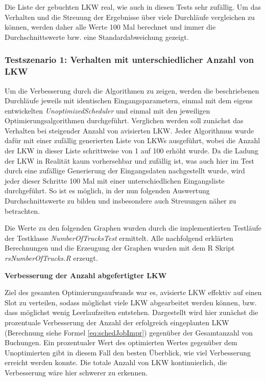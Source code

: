 Die Liste der gebuchten LKW real, wie auch in diesen Tests sehr zufällig. Um das Verhalten und die Streuung der Ergebnisse über viele Durchläufe vergleichen zu können, werden daher alle Werte 100 Mal berechnet und immer die Durchschnittswerte bzw. eine Standardabweichung gezeigt. 

\subsubsection{Testszenario 1: Verhalten mit unterschiedlicher Anzahl von LKW}

Um die Verbesserung durch die Algorithmen zu zeigen, werden die beschriebenen Durchläufe jeweils mit identischen Eingangsparametern, einmal mit dem eigens entwickelten \textit{UnoptimizedScheduler} und einmal mit den jeweiligen Optimierungsalgorithmen durchgeführt. Verglichen werden soll zunächst das Verhalten bei steigender Anzahl von avisierten LKW. Jeder Algorithmus wurde dafür mit einer zufällig generierten Liste von LKWs ausgeführt, wobei die Anzahl der LKW in dieser Liste schrittweise von 1 auf 100  erhöht wurde. Da die Ladung der LKW in Realität kaum vorhersehbar und zufällig ist, was auch hier im Test durch eine zufällige Generierung der Eingangsdaten nachgestellt wurde, wird jeder dieser Schritte 100 Mal mit einer unterschiedlichen Eingangsliste durchgeführt. So ist es möglich, in der nun folgenden Auswertung Durchschnittswerte zu bilden und insbesondere auch Streuungen näher zu betrachten.

Die Werte zu den folgenden Graphen wurden durch die implementierten Testläufe der Testklasse \textit{NumberOfTrucksTest} ermittelt. Alle nachfolgend erklärten Berechnungen und die Erzeugung der Graphen wurden mit dem R Skript \textit{rsNumberOfTrucks.R} erzeugt.


\textbf{Verbesserung der Anzahl abgefertigter LKW}

Ziel des gesamten Optimierungsaufwands war es, avisierte LKW effektiv auf einen Slot zu verteilen, sodass möglichst viele LKW abgearbeitet werden können, bzw. dass möglichst wenig Leerlaufzeiten entstehen. Dargestellt wird hier zunächst die prozentuale Verbesserung der Anzahl der erfolgreich eingeplanten LKW (Berechnung siehe Formel \ref{eq:schedJobImpr}) gegenüber der Gesamtanzahl von Buchungen. Ein prozentualer Wert des optimierten Wertes gegenüber dem Unoptimierten gibt in diesem Fall den besten Überblick, wie viel Verbesserung erreicht werden konnte. Die totale Anzahl von LKW kontinuierlich, die Verbesserung wäre hier schwerer zu erkennen.

